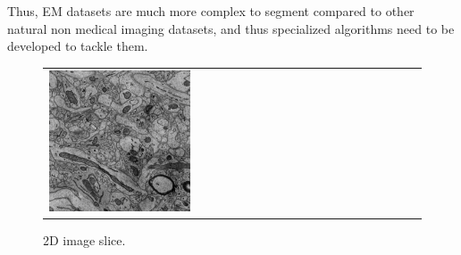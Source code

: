 Thus, EM datasets are much more complex to segment compared to other natural non medical imaging datasets, and thus specialized algorithms need to be developed to tackle them.


\begin{figure}[htpb]
  \centering
  \newcommand{\mywidth}{0.4\textwidth}
  \newcommand{\myheight}{0.3\textwidth}
  \newcommand{\mywidthLarge}{0.3\textwidth}
  \newcommand{\myheightLarge}{0.3\textwidth}
  \newcolumntype{X}{ >{\centering\arraybackslash} m{\mywidth} }
  \setlength\tabcolsep{3mm} %
  \def\arraystretch{0}%
  \begin{tabular}{XX}
	\includegraphics[height=\myheight,width=\mywidth, keepaspectratio]{data/images/snemiGlimpse/snemiTrainSliceImages.png}\caption*{2D image slice.}&

\end{tabular}
\end{figure}

